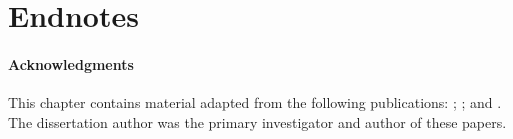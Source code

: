 \section*{Endnotes}
\paragraph{Acknowledgments}
  This chapter contains material adapted from the following
  publications:
  ;
  ; and
  .
  The dissertation author was the primary investigator and author of
  these papers.



